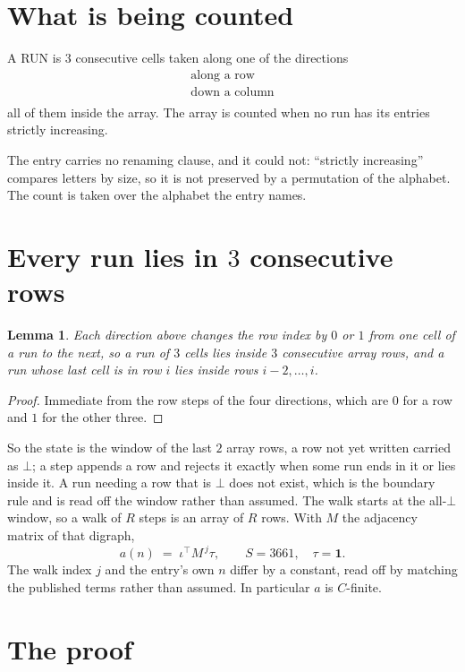 \documentclass[11pt,a4paper]{article}
\theoremstyle{plain}
\newtheorem{lemma}[theorem]{Lemma}
\theoremstyle{definition}
\begin{document}
\section{What is being counted}

A RUN is $3$ consecutive cells taken along one of the directions
\[
\begin{array}{l}
\text{along a row} \\
\text{down a column} \\
\end{array}
\]
all of them inside the array. The array is counted when no run has its entries strictly increasing.


The entry carries no renaming clause, and it could not: ``strictly increasing'' compares
letters by size, so it is not preserved by a permutation of the alphabet. The count is taken
over the alphabet the entry names.

\section{Every run lies in $3$ consecutive rows}

\begin{lemma}\label{lem:win}
Each direction above changes the row index by $0$ or $1$ from one cell of a run to the next, so
a run of $3$ cells lies inside $3$ consecutive array rows, and a run whose last cell is in
row $i$ lies inside rows $i-2,\dots,i$.
\end{lemma}

\begin{proof}
Immediate from the row steps of the four directions, which are $0$ for a row and $1$ for the
other three.
\end{proof}

So the state is the window of the last $2$ array rows, a row not yet written carried as
$\bot$; a step appends a row and rejects it exactly when some run ends in it or lies inside it.
A run needing a row that is $\bot$ does not exist, which is the boundary rule and is read off
the window rather than assumed. The walk starts at the all-$\bot$ window, so a walk of $R$ steps
is an array of $R$ rows. With $M$ the adjacency matrix of that digraph,
\[
a(n)\;=\;\iota^{\!\top}M^{\,j}\tau ,\qquad S=3661,\quad\tau=\mathbf{1} .
\]
The walk index $j$ and the entry's own $n$ differ by a constant, read off by matching the
published terms rather than assumed. In particular $a$ is $C$-finite.

\section{The proof}
\end{document}
